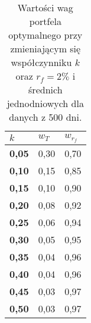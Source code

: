 \documentclass[magister]{dyplom}
\begin{document}
\begin{table}[ht]
	\centering
	\caption{Wartości wag portfela optymalnego przy zmieniającym się współczynniku $k$ oraz $r_f = 2\%$ i średnich jednodniowych dla danych z 500 dni.}
	\begin{tabular}{|l|l|l|}
		\hline
		\textbf{$k$} & \textbf{$w_T$} & \textbf{$w_{r_f}$} \\ \hline
		\textbf{0,05}                                             & 0,30           & 0,70            \\ \hline
		\textbf{0,10}                                              & 0,15          & 0,85           \\ \hline
		\textbf{0,15}                                             & 0,10           & 0,90           \\ \hline
		\textbf{0,20}                                              & 0,08          & 0,92           \\ \hline
		\textbf{0,25}                                             & 0,06          & 0,94           \\ \hline
		\textbf{0,30}                                              & 0,05          & 0,95           \\ \hline
		\textbf{0,35}                                             & 0,04          & 0,96           \\ \hline
		\textbf{0,40}                                              & 0,04          & 0,96           \\ \hline
		\textbf{0,45}                                             & 0,03          & 0,97           \\ \hline
		\textbf{0,50}                                              & 0,03          & 0,97           \\ \hline
	\end{tabular}
\end{table}
\end{document}
